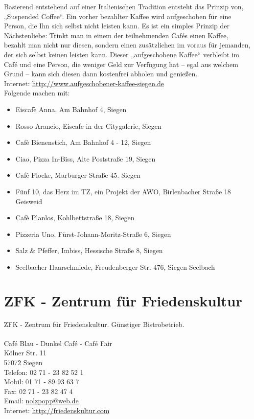 Basierend entstehend auf einer Italienischen Tradition entsteht das Prinzip von, „Suspended Coffee“.  Ein vorher bezahlter Kaffee wird aufgeschoben für eine Person, die Ihn sich selbst nicht leisten kann. Es ist ein simples Prinzip der Nächstenliebe: Trinkt man in einem der teilnehmenden Cafés einen Kaffee, bezahlt man nicht nur diesen, sondern einen zusätzlichen im voraus für jemanden, der sich selbst keinen leisten kann. Dieser „aufgeschobene Kaffee“ verbleibt im Café und eine Person, die weniger Geld zur Verfügung hat – egal aus welchem Grund – kann sich diesen dann kostenfrei abholen und genießen.\\
Internet: \href{http://www.aufgeschobener-kaffee-siegen.de}{http://www.aufgeschobener-kaffee-siegen.de}\\
Folgende machen mit:\\
\begin{itemize}
	\item Eiscafè Anna, Am Bahnhof 4, Siegen  
	\item Rosso Arancio, Eiscafe in der Citygalerie, Siegen
	\item Cafè Bienenstich, Am Bahnhof 4 - 12, Siegen
	\item Ciao, Pizza In-Biss, Alte Poststraße 19, Siegen
	\item Cafè Flocke, Marburger Straße 45. Siegen  
	\item Fünf 10, das Herz im TZ, ein Projekt der AWO, Birlenbacher Straße 18 Geisweid
	\item Cafè Planlos, Kohlbettstraße 18, Siegen  
	\item Pizzeria Uno, Fürst-Johann-Moritz-Straße 6, Siegen 
	\item Salz \& Pfeffer, Imbiss, Hessische Straße 8, Siegen
	\item Seelbacher Haarschmiede, Freudenberger Str. 476, Siegen Seelbach 
\end{itemize}

\section{ZFK - Zentrum für Friedenskultur}
ZFK - Zentrum für Friedenskultur. Günstiger Bistrobetrieb.\\
\\
Café Blau - Dunkel Café - Café Fair \\
Kölner Str. 11 \\
57072 Siegen \\
Telefon: 02 71 - 23 82 52 1\\
Mobil: 01 71 - 89 93 63 7\\ 
Fax: 02 71 - 23 82 47 4\\  
Email: \href{mailto:nolzpopp@web.de}{nolzpopp@web.de} \\ 
Internet: \href{http://friedenskultur.com}{http://friedenskultur.com}\\

